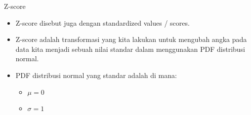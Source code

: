 \documentclass[
  ignorenonframetext,
]{beamer}
\begin{document}
\begin{frame}{Z-score}
\label{z-score}
\begin{itemize}
\item
  Z-score disebut juga dengan standardized values / scores.
\item
  Z-score adalah transformasi yang kita lakukan untuk mengubah angka
  pada data kita menjadi sebuah nilai standar dalam menggunakan PDF
  distribusi normal.
\item
  PDF distribusi normal yang standar adalah di mana:

  \begin{itemize}
  \item
    \(\mu=0\)
  \item
    \(\sigma=1\)
  \end{itemize}
\end{itemize}
\end{frame}
\end{document}
